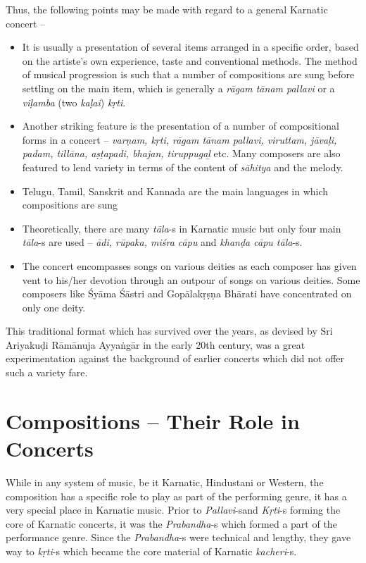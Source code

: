 Thus, the following points may be made with regard to a general Karnatic concert –

\begin{itemize}
\itemsep=0pt
\item It is usually a presentation of several items arranged in a specific order, based on the artiste’s own experience, taste and conventional methods. The method of musical progression is such that a number of compositions are sung before settling on the main item, which is generally a \textit{rāgam tānam pallavi} or a \textit{viḷamba} (two \textit{kaḷai}) \textit{kṛti}.

 \item Another striking feature is the presentation of a number of compositional forms in a concert – \textit{varṇam, kṛti, rāgam tānam pallavi, viruttam, jāvaḷi, padam, tillāna, aṣṭapadi, bhajan, tiruppugaḻ} etc. Many composers are also featured to lend variety in terms of the content of \textit{sāhitya} and the melody.

 \item Telugu, Tamil, Sanskrit and Kannada are the main languages in which compositions are sung

 \item Theoretically, there are many \textit{tāla}-s in Karnatic music but only four main \textit{tāla}-s are used – \textit{ādi, rūpaka, miśra cāpu} and \textit{khanḍa cāpu tāla}-s.

 \item The concert encompasses songs on various deities as each composer has given vent to his/her devotion through an outpour of songs on various deities. Some composers like Śyāma Śāstri and Gopālakṛṣṇa Bhārati have concentrated on only one deity.

\end{itemize}

This traditional format which has survived over the years, as devised by Sri Ariyakuḍi Rāmānuja Ayyaṅgār in the early 20th century, was a great experimentation against the background of earlier concerts which did not offer such a variety fare.

\vspace{-.3cm}

\section*{Compositions – Their Role in Concerts}

While in any system of music, be it Karnatic, Hindustani or Western, the composition has a specific role to play as part of the performing genre, it has a very special place in Karnatic music. Prior to \textit{Pallavi}-s\break and \textit{Kṛti}-s forming the core of Karnatic concerts, it was the \textit{Praban\break dha}-s which formed a part of the performance genre. Since the \textit{Prabandha}-s were technical and lengthy, they gave way to \textit{kṛti}-s which became the core material of Karnatic \textit{kacheri}-s.

